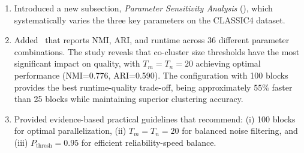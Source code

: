 \documentclass{ar2rc}
\begin{document}

\begin{enumerate}
  \item Introduced a new subsection, \emph{Parameter Sensitivity Analysis} (), which systematically varies the three key parameters on the CLASSIC4 dataset.
  \item Added~ that reports NMI, ARI, and runtime across 36 different parameter combinations. The study reveals that co-cluster size thresholds have the most significant impact on quality, with $T_m=T_n=20$ achieving optimal performance (NMI=0.776, ARI=0.590). The configuration with 100 blocks provides the best runtime-quality trade-off, being approximately $55\%$ faster than 25 blocks while maintaining superior clustering accuracy.
  \item Provided evidence-based practical guidelines that recommend: (i) 100 blocks for optimal parallelization, (ii) $T_m=T_n=20$ for balanced noise filtering, and (iii) $P_{\text{thresh}}=0.95$ for efficient reliability-speed balance.
\end{enumerate}
\end{document}

